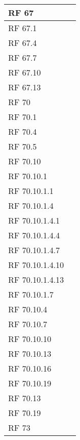 {\begin{center}
\begin{longtable} [c]{| p{2cm} | p{13cm} |}
	 \hline 
	RF 67 & \\ 
	 \hline 
	RF 67.1 & \\ 
	 \hline 
	RF 67.4 & \\ 
	 \hline 
	RF 67.7 & \\ 
	 \hline 
	RF 67.10 & \\ 
	 \hline 
	RF 67.13 & \\ 
	 \hline 
	RF 70 & \\ 
	 \hline 
	RF 70.1 & \\ 
	 \hline 
	RF 70.4 & \\ 
	 \hline 
	RF 70.5 & \\ 
	 \hline 
	RF 70.10 & \\ 
	 \hline 
	RF 70.10.1 & \\ 
	 \hline 
	RF 70.10.1.1 & \\ 
	 \hline 
	RF 70.10.1.4 & \\ 
	 \hline 
	RF 70.10.1.4.1 & \\ 
	 \hline 
	RF 70.10.1.4.4 & \\ 
	 \hline 
	RF 70.10.1.4.7 & \\ 
	 \hline 
	RF 70.10.1.4.10 & \\ 
	 \hline 
	RF 70.10.1.4.13 & \\ 
	 \hline 
	RF 70.10.1.7 & \\ 
	 \hline 
	RF 70.10.4 & \\ 
	 \hline 
	RF 70.10.7 & \\ 
	 \hline 
	RF 70.10.10 & \\ 
	 \hline 
	RF 70.10.13 & \\ 
	 \hline 
	RF 70.10.16 & \\ 
	 \hline 
	RF 70.10.19 & \\ 
	 \hline 
	RF 70.13 & \\ 
	 \hline 
	RF 70.19 & \\ 
	 \hline 
	RF 73 & \\ 
	 \hline 
	\end{longtable}
\end{center}
}



